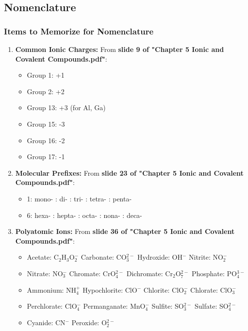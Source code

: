 \documentclass{article}
\begin{document}
\subsection*{Nomenclature}
\subsubsection*{Items to Memorize for Nomenclature}
\begin{enumerate}[itemsep=5pt]
    \item \textbf{Common Ionic Charges:} From \textbf{slide 9 of "Chapter 5 Ionic and Covalent Compounds.pdf"}:
    \begin{itemize}
        \item Group 1: +1
        \item Group 2: +2
        \item Group 13: +3 (for Al, Ga)
        \item Group 15: -3
        \item Group 16: -2
        \item Group 17: -1
    \end{itemize}
    \item \textbf{Molecular Prefixes:} From \textbf{slide 23 of "Chapter 5 Ionic and Covalent Compounds.pdf"}:
    \begin{itemize}
        \item 1: mono- : di- : tri- : tetra- : penta-
        \item 6: hexa- : hepta- : octa- : nona- : deca-
    \end{itemize}
    \item \textbf{Polyatomic Ions:} From \textbf{slide 36 of "Chapter 5 Ionic and Covalent Compounds.pdf"}:
    \begin{itemize}
        \item Acetate: C\(_2\)H\(_3\)O\(_2^-\) \quad Carbonate: CO\(_3^{2-}\) \quad Hydroxide: OH\(^-\) \quad Nitrite: NO\(_2^-\)
        \item Nitrate: NO\(_3^-\) \quad Chromate: CrO\(_4^{2-}\) \quad Dichromate: Cr\(_2\)O\(_7^{2-}\) \quad Phosphate: PO\(_4^{3-}\)
        \item Ammonium: NH\(_4^+\) \quad Hypochlorite: ClO\(^-\) \quad Chlorite: ClO\(_2^-\) \quad Chlorate: ClO\(_3^-\)
        \item Perchlorate: ClO\(_4^-\) \quad Permanganate: MnO\(_4^-\) \quad Sulfite: SO\(_3^{2-}\) \quad Sulfate: SO\(_4^{2-}\)
        \item Cyanide: CN\(^-\) \quad Peroxide: O\(_2^{2-}\)
    \end{itemize}
\end{enumerate}
\end{document}
